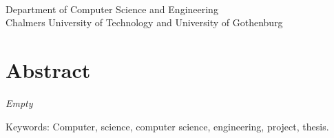 \oneLineTitle\\
\oneLineSubtitle\\
\authorNames\\
Department of Computer Science and Engineering\\
Chalmers University of Technology and University of Gothenburg\setlength{\parskip}{0.5cm}

\thispagestyle{plain}			%
\setlength{\parskip}{0pt plus 1.0pt}
\section*{Abstract}

\emph{Empty}

\vfill
Keywords: Computer, science, computer science, engineering, project, thesis.

\newpage				%
\thispagestyle{empty}
\mbox{}